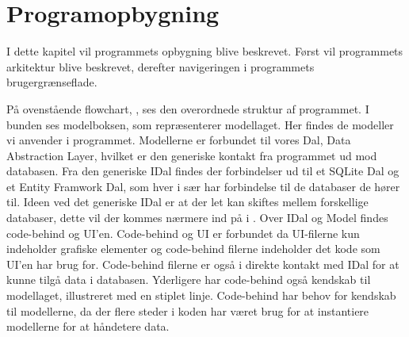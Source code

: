 \chapter{Programopbygning}

I dette kapitel vil programmets opbygning blive beskrevet. Først vil programmets arkitektur blive beskrevet, derefter navigeringen i programmets brugergrænseflade.


På ovenstående flowchart, , ses den overordnede struktur af programmet.
I bunden ses modelboksen, som repræsenterer modellaget.
Her findes de modeller vi anvender i programmet.
Modellerne er forbundet til vores Dal, Data Abstraction Layer, hvilket er den generiske kontakt fra programmet ud mod databasen.
Fra den generiske IDal findes der forbindelser ud til et SQLite Dal og et Entity Framwork Dal, som hver i sær har forbindelse til de databaser de hører til.
Ideen ved det generiske IDal er at der let kan skiftes mellem forskellige databaser, dette vil der kommes nærmere ind på i .
Over IDal og Model findes code-behind og UI'en.
Code-behind og UI er forbundet da UI-filerne kun indeholder grafiske elementer og code-behind filerne indeholder det kode som UI'en har brug for.
Code-behind filerne er også i direkte kontakt med IDal for at kunne tilgå data i databasen.
Yderligere har code-behind også kendskab til modellaget, illustreret med en stiplet linje.
Code-behind har behov for kendskab til modellerne, da der flere steder i koden har været brug for at instantiere modellerne for at håndetere data. 



